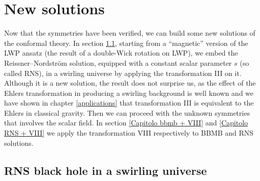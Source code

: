 \chapter{New solutions} \label{new solutions}
\thispagestyle{empty}
Now that the symmetries have been verified, we can build some new solutions of the conformal theory. In section \ref{sezione RNS in swirling universe}, starting from a ``magnetic'' version of the LWP ansatz (the result of a double-Wick rotation on LWP), we embed the Reissner–Nordström solution, equipped with a constant scalar parameter $s$ (so called RNS), in a swirling universe by applying the transformation III on it. Although it is a new solution, the result does not surprise us, as the effect of the Ehlers transformation in producing a swirling background is well known and we have shown in chapter \ref{applications} that transformation III is equivalent to the Ehlers in classical gravity. Then we can proceed with the unknown symmetries that involves the scalar field. In section \ref{Capitolo bbmb + VIII} and \ref{Capitolo RNS + VIII} we apply the transformation VIII respectively to BBMB and RNS solutions. 

\section{RNS black hole in a swirling universe} \label{sezione RNS in swirling universe}

